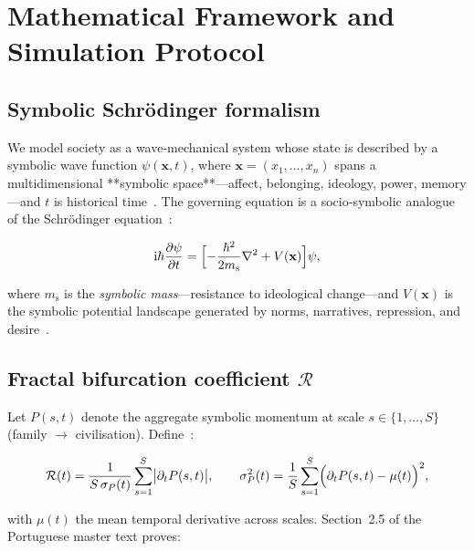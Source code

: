 \section{Mathematical Framework and Simulation Protocol}
\label{sec:methods}

\subsection{Symbolic Schrödinger formalism}

We model society as a wave‑mechanical system whose state is described by a
symbolic wave function $\psi(\mathbf{x},t)$, where
$\mathbf{x}=(x_{1},\ldots,x_{n})$ spans a multidimensional **symbolic
space**—affect, belonging, ideology, power, memory—and $t$ is historical
time \citep{mandelbrot1982,schrodinger1944}.  
The governing equation is a socio‑symbolic analogue of the
Schrödinger equation :

\begin{equation}
\label{eq:social_schroedinger}
\mathrm{i}\hbar\frac{\partial\psi}{\partial t}
  =\Bigl[-\frac{\hbar^{2}}{2m_{\mathrm{s}}}\nabla^{2}+V(\mathbf{x})\Bigr]\psi,
\end{equation}

where $m_{\mathrm{s}}$ is the \emph{symbolic mass}—resistance to
ideological change—and $V(\mathbf{x})$ is the symbolic potential
landscape generated by norms, narratives, repression, and desire .

\subsection{Fractal bifurcation coefficient \texorpdfstring{$\mathcal{R}$}{R}}

Let $P(s,t)$ denote the aggregate symbolic momentum at scale
$s\!\in\!\{1,\ldots,S\}$ (family $\rightarrow$ civilisation).
Define \citep{sporns2011,scheffer2009}:

\begin{equation}
\label{eq:R_def}
\mathcal{R}(t)=\frac{1}{S\,\sigma_{P}(t)}
\sum_{s=1}^{S}\bigl|\partial_{t}P(s,t)\bigr|,
\qquad
\sigma_{P}^{2}(t)=\frac{1}{S}\sum_{s=1}^{S}
\Bigl(\partial_{t}P(s,t)-\mu(t)\Bigr)^{2},
\end{equation}

with $\mu(t)$ the mean temporal derivative across scales.
Section~2.5 of the Portuguese master text proves:

